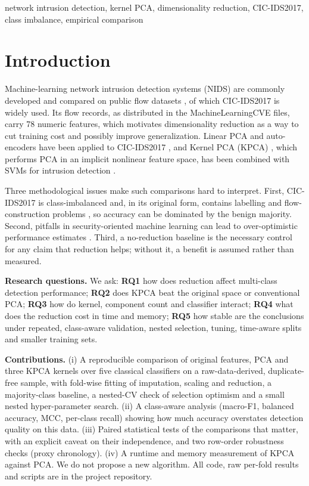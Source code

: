 \documentclass[conference]{IEEEtran}
\begin{document}
\begin{IEEEkeywords}
network intrusion detection, kernel PCA, dimensionality reduction, CIC-IDS2017, class imbalance, empirical comparison
\end{IEEEkeywords}

\section{Introduction}
Machine-learning network intrusion detection systems (NIDS) are commonly developed and compared on public flow datasets \cite{ring2019}, of which CIC-IDS2017 \cite{sharafaldin2018} is widely used. Its flow records, as distributed in the MachineLearningCVE files, carry 78 numeric features, which motivates dimensionality reduction as a way to cut training cost and possibly improve generalization. Linear PCA and auto-encoders have been applied to CIC-IDS2017 \cite{abdulhammed2019}, and Kernel PCA (KPCA) \cite{scholkopf1998}, which performs PCA in an implicit nonlinear feature space, has been combined with SVMs for intrusion detection \cite{kuang2014}.

Three methodological issues make such comparisons hard to interpret. First, CIC-IDS2017 is class-imbalanced and, in its original form, contains labelling and flow-construction problems \cite{engelen2021,panigrahi2018}, so accuracy can be dominated by the benign majority. Second, pitfalls in security-oriented machine learning can lead to over-optimistic performance estimates \cite{arp2022}. Third, a no-reduction baseline is the necessary control for any claim that reduction helps; without it, a benefit is assumed rather than measured.

\textbf{Research questions.} We ask: \textbf{RQ1} how does reduction affect multi-class detection performance; \textbf{RQ2} does KPCA beat the original space or conventional PCA; \textbf{RQ3} how do kernel, component count and classifier interact; \textbf{RQ4} what does the reduction cost in time and memory; \textbf{RQ5} how stable are the conclusions under repeated, class-aware validation, nested selection, tuning, time-aware splits and smaller training sets.

\textbf{Contributions.} (i) A reproducible comparison of original features, PCA and three KPCA kernels over five classical classifiers on a raw-data-derived, duplicate-free sample, with fold-wise fitting of imputation, scaling and reduction, a majority-class baseline, a nested-CV check of selection optimism and a small nested hyper-parameter search. (ii) A class-aware analysis (macro-F1, balanced accuracy, MCC, per-class recall) showing how much accuracy overstates detection quality on this data. (iii) Paired statistical tests of the comparisons that matter, with an explicit caveat on their independence, and two row-order robustness checks (proxy chronology). (iv) A runtime and memory measurement of KPCA against PCA. We do not propose a new algorithm. All code, raw per-fold results and scripts are in the project repository.
\end{document}
